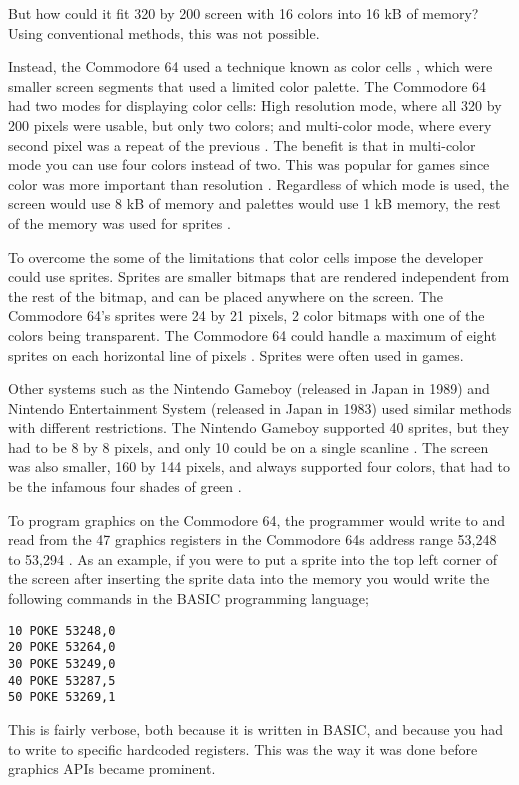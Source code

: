 But how could it fit 320 by 200 screen with 16 colors into 16 kB of memory?
Using conventional methods, this was not possible.

Instead, the Commodore 64 used a technique known as color cells \cite{commodore1983commodore}, which were smaller screen segments that used a limited color palette.
The Commodore 64 had two modes for displaying color cells: High resolution mode, where all 320 by 200 pixels were usable, but only two colors; and multi-color mode, where every second pixel was a repeat of the previous \cite{commodore1983commodore}.
The benefit is that in multi-color mode you can use four colors instead of two.
This was popular for games since color was more important than resolution \cite{bogdan2014games}.
Regardless of which mode is used, the screen would use 8 kB of memory and palettes would use 1 kB memory, the rest of the memory was used for sprites \cite{commodore1983commodore}.

To overcome the some of the limitations that color cells impose the developer could use sprites.
Sprites are smaller bitmaps that are rendered independent from the rest of the bitmap, and can be placed anywhere on the screen.
The Commodore 64's sprites were 24 by 21 pixels, 2 color bitmaps with one of the colors being transparent.
The Commodore 64 could handle a maximum of eight sprites on each horizontal line of pixels \cite{commodore1983commodore}.
Sprites were often used in games.

Other systems such as the Nintendo Gameboy (released in Japan in 1989) and Nintendo Entertainment System (released in Japan in 1983) used similar methods with different restrictions.
The Nintendo Gameboy supported 40 sprites, but they had to be 8 by 8 pixels, and only 10 could be on a single scanline \cite{nintendo1999gameboy}. 
The screen was also smaller, 160 by 144 pixels, and always supported four colors, that had to be the infamous four shades of green \cite{nintendo1999gameboy}.

To program graphics on the Commodore 64, the programmer would write to and read from the 47 graphics registers in the Commodore 64s address range 53,248 to 53,294 \cite{commodore1983commodore}.
As an example, if you were to put a sprite into the top left corner of the screen after inserting the sprite data into the memory you would write the following commands in the BASIC programming language; 

\begin{lstlisting}[caption={Small BASIC program that sets the coordinate of sprite 0 to (0,0) (line 1-3), sets the color to green (line 4), and enables sprite 0 it (line 5). Line 5 is a bit mask telling the graphics chip which sprits should be shown.}]
10 POKE 53248,0
20 POKE 53264,0
30 POKE 53249,0
40 POKE 53287,5
50 POKE 53269,1
\end{lstlisting}
This is fairly verbose, both because it is written in BASIC, and because you had to write to specific hardcoded registers.
This was the way it was done before graphics \glspl{API} became prominent.

